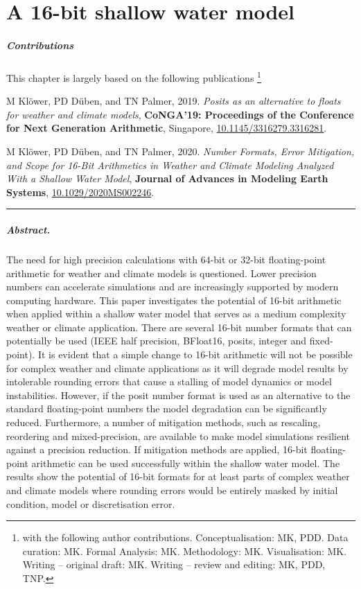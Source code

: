 \chapter{A 16-bit shallow water model}
\label{chap:shallow_water}

\small \paragraph{Contributions} This chapter is largely based on the following publications \footnote{with the following author contributions.
Conceptualisation: MK, PDD. Data curation: MK. Formal Analysis: MK. Methodology: MK. Visualisation: MK. Writing – original draft:
MK. Writing – review and editing: MK, PDD, TNP.}

\vspace{\baselineskip}
\indent M Klöwer, PD Düben, and TN Palmer, 2019. \emph{Posits as an alternative to floats for weather and climate models},
\textbf{CoNGA'19: Proceedings of the Conference for Next Generation Arithmetic}, Singapore,
\href{https://doi.org/10.1145/3316279.3316281}{10.1145/3316279.3316281}.

\indent M Klöwer, PD Düben, and TN Palmer, 2020. \emph{Number Formats, Error Mitigation, and Scope for 16-Bit Arithmetics
in Weather and Climate Modeling Analyzed With a Shallow Water Model}, \textbf{Journal of Advances in Modeling Earth Systems},
\href{https://doi.org/10.1029/2020MS002246}{10.1029/2020MS002246}.
\vspace{\baselineskip}
\hrule
\vspace{\baselineskip}
\normalsize

\paragraph{Abstract.} The need for high precision calculations with 64-bit or 32-bit floating-point arithmetic for weather and
climate models is questioned. Lower precision numbers can accelerate simulations and are increasingly supported
by modern computing hardware. This paper investigates the potential of 16-bit arithmetic when applied within a shallow
water model that serves as a medium complexity weather or climate application. There are several 16-bit number
formats that can potentially be used (IEEE half precision, BFloat16, posits, integer and fixed-point). It is evident that a
simple change to 16-bit arithmetic will not be possible for complex weather and climate applications as it will degrade model
results by intolerable rounding errors that cause a stalling of model dynamics or model instabilities. However, if the posit number
format is used as an alternative to the standard floating-point numbers the model degradation can be significantly reduced.
Furthermore, a number of mitigation methods, such as rescaling, reordering and mixed-precision, are available to make model
simulations resilient against a precision reduction. If mitigation methods are applied, 16-bit floating-point arithmetic can be used
successfully within the shallow water model. The results show the potential of 16-bit formats for at least parts of complex weather
and climate models where rounding errors would be entirely masked by initial condition, model or discretisation error.

